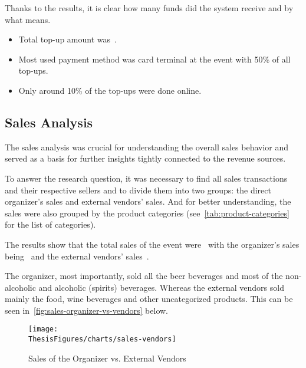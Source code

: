 Thanks to the results, it is clear how many funds did the system receive and by what means.

\begin{keytakeaways}
	\begin{itemize}
		\item Total top-up amount was~.
		\item Most used payment method was card terminal at the event with 50\% of all top-ups.
		\item Only around 10\% of the top-ups were done online.
	\end{itemize}
\end{keytakeaways}


\subsection{Sales Analysis}
\label{subsec:analysis-sales}
\begin{rqbox}
	\textit{}
\end{rqbox}

The sales analysis was crucial for understanding the overall sales behavior and served as a basis for further insights tightly connected to the revenue sources.

To answer the research question, it was necessary to find all sales transactions and their respective sellers and to divide them into two groups: the direct organizer's sales and external vendors' sales.
And for better understanding, the sales were also grouped by the product categories (see~\autoref{tab:product-categories} for the list of categories).

The results show that the total sales of the event were~ with the organizer's sales being~ and the external vendors' sales~.

The organizer, most importantly, sold all the beer beverages and most of the non-alcoholic and alcoholic (spirits) beverages.
Whereas the external vendors sold mainly the food, wine beverages and other uncategorized products.
This can be seen in~\autoref{fig:sales-organizer-vs-vendors} below.

\begin{figure}[H]
	\centering
	\texttt{[image: \\ThesisFigures/charts/sales-vendors]}
	\caption{Sales of the Organizer vs. External Vendors}
	\label{fig:sales-organizer-vs-vendors}
	\source
\end{figure}

